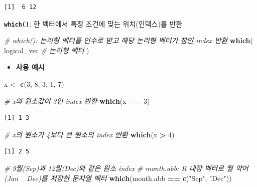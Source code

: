 \documentclass[
  11pt,
]{krantz}
\newenvironment{Shaded}{\begin{snugshade}}{\end{snugshade}}
\newcommand{\CommentTok}[1]{\textcolor[rgb]{0.37,0.37,0.37}{\textit{#1}}}
\newcommand{\DecValTok}[1]{\textcolor[rgb]{0.06,0.06,0.06}{#1}}
\newcommand{\KeywordTok}[1]{\textcolor[rgb]{0.27,0.27,0.27}{\textbf{#1}}}
\newcommand{\NormalTok}[1]{#1}
\newcommand{\OperatorTok}[1]{\textcolor[rgb]{0.43,0.43,0.43}{\textbf{#1}}}
\newcommand{\StringTok}[1]{\textcolor[rgb]{0.5,0.5,0.5}{#1}}
\providecommand{\tightlist}{%
  \setlength{\itemsep}{0pt}\setlength{\parskip}{0pt}}
\begin{document}
\begin{verbatim}
[1]  6 12
\end{verbatim}

\normalsize

\textbf{\texttt{which()}}: 한 벡터에서 특정 조건에 맞는 위치(인덱스)를 반환

\footnotesize

\begin{Shaded}
\begin{Highlighting}[]
\CommentTok{# which(): 논리형 벡터를 인수로 받고 해당 논리형 벡터가 참인 index 반환}
\KeywordTok{which}\NormalTok{(}
\NormalTok{  logical_vec }\CommentTok{# 논리형 벡터}
\NormalTok{)}
\end{Highlighting}
\end{Shaded}

\normalsize

\begin{itemize}
\tightlist
\item
  \textbf{사용 예시}
\end{itemize}

\footnotesize

\begin{Shaded}
\begin{Highlighting}[]
\NormalTok{x <-}\StringTok{ }\KeywordTok{c}\NormalTok{(}\DecValTok{3}\NormalTok{, }\DecValTok{8}\NormalTok{, }\DecValTok{3}\NormalTok{, }\DecValTok{1}\NormalTok{, }\DecValTok{7}\NormalTok{)}

\CommentTok{# x의 원소값이 3인 index 반환}
\KeywordTok{which}\NormalTok{(x }\OperatorTok{==}\StringTok{ }\DecValTok{3}\NormalTok{)}
\end{Highlighting}
\end{Shaded}

\begin{verbatim}
[1] 1 3
\end{verbatim}

\begin{Shaded}
\begin{Highlighting}[]
\CommentTok{# x의 원소가 4보다 큰 원소의 index 반환}
\KeywordTok{which}\NormalTok{(x }\OperatorTok{>}\StringTok{ }\DecValTok{4}\NormalTok{)}
\end{Highlighting}
\end{Shaded}

\begin{verbatim}
[1] 2 5
\end{verbatim}

\begin{Shaded}
\begin{Highlighting}[]
\CommentTok{# 9월(Sep)과 12월(Dec)와 같은 원소 index}
\CommentTok{# month.abb: R 내장 벡터로 월 약어(Jan ~ Dec)를 저장한 문자열 벡터}
\KeywordTok{which}\NormalTok{(month.abb }\OperatorTok{==}\StringTok{ }\KeywordTok{c}\NormalTok{(}\StringTok{"Sep"}\NormalTok{, }\StringTok{"Dec"}\NormalTok{))}
\end{Highlighting}
\end{Shaded}
\end{document}
